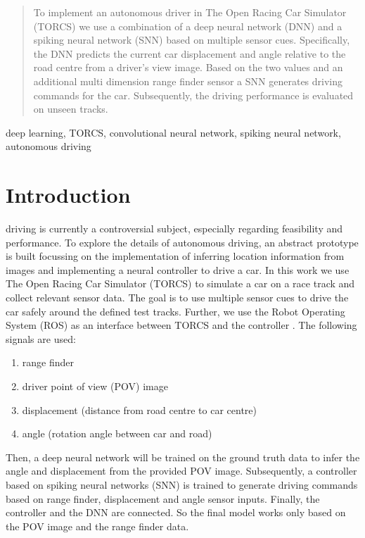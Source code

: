 \documentclass[10pt,a4paper,twoside,journal]{IEEEtran}
\begin{document}
\begin{abstract}
	To implement an autonomous driver in The Open Racing Car Simulator (TORCS)
	we use a combination of a deep neural network (DNN) and a spiking neural network (SNN) based on multiple
	sensor cues. Specifically, the DNN predicts the current car displacement
	and angle relative to the road centre from a driver's view image. Based on the two values
	and an additional multi dimension range finder sensor a SNN generates driving commands for the car. Subsequently, the driving performance is evaluated on unseen tracks.
\end{abstract}

\begin{IEEEkeywords}
	deep learning, TORCS, convolutional neural network, spiking neural network, autonomous driving
\end{IEEEkeywords}

%
%
\section{Introduction}
\label{sc:intro}

 driving is currently a controversial subject, especially 
regarding feasibility and performance. To explore the details of autonomous driving, an abstract prototype is built focussing on the implementation of inferring location information from images and implementing a neural controller to drive a car. In this work we use The Open Racing Car Simulator (TORCS) to simulate a car on a race track and collect relevant sensor data. The goal is to use multiple sensor cues to drive the car safely around the defined test tracks. Further, we use the Robot Operating System (ROS) \cite{ros-2009} as an interface between TORCS and the controller \cite{mirus_torcs-ros_2017}. The following signals are used:
\begin{enumerate}
	\item range finder
	\item driver point of view (POV) image
	\item displacement (distance from road centre to car centre)
	\item angle (rotation angle between car and road)
\end{enumerate}
Then, a deep neural network will be trained on the ground truth data to infer the angle and displacement from the provided POV image. Subsequently, a controller based on spiking neural networks (SNN) is trained to generate driving commands based on range finder, displacement and angle sensor inputs. Finally, the controller and the DNN are connected. So the final model works only based on the POV image and the range finder data.
\end{document}
